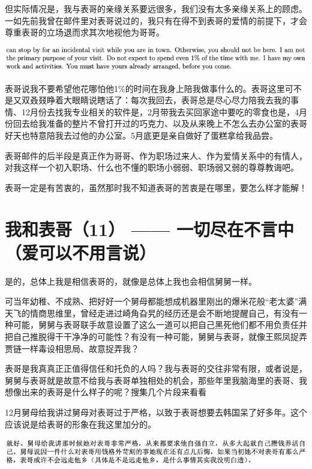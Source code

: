 \documentclass[9pt, b5paper]{article}
\begin{document}
但实际情况是，我与表哥的亲缘关系要远很多，我们没有太多亲缘关系上的顾虑。一如先前我曾在邮件里对表哥说过的，我只有在得不到表哥的爱情的前提下，才会尊重表哥的立场退而求其次地视他为哥哥。 

\begin{center}
\includegraphics[width=.9\linewidth]{./pic/p1p64-1.png}
\end{center}

表哥说我不要希望他花哪怕他1\%的时间在我身上陪我做事什么的。表哥这里可不是又双叒叕睁着大眼睛说瞎话了：每次我回去，表哥总是尽心尽力陪我去我的事情、12月份去找我专业相关的软件是，2月带我去买回家途中要吃的零食也是，4月份回去给我准备的整片不曾打开过的巧克力、以及从来晚上不怎么去办公室的表哥好天也特意陪我去过他的办公室。5月底更是亲自做好了蛋糕拿给我品尝。

表哥邮件的后半段是真正作为哥哥、作为职场过来人、作为爱情关系中的有情人，对我这样一个初入职场、什么也不懂的职场小弱弱、职场弱又弱的尊尊教诲吧。

表哥一定是有苦衷的，虽然那时我不知道表哥的苦衷是在哪里，要怎么样才能解！
\section{我和表哥（11） —— 一切尽在不言中（爱可以不用言说）}
\label{sec:org22784ad}

是的，总体上我是相信表哥的，就像是总体上我也会相信舅舅一样。

可当年幼稚、不成熟、把好好一个舅母都能想成机器里刚出的爆米花般“老太婆”满天飞的情商思维里，曾经走进过崎角旮旯的经历还是会不断地提醒自己，有没有一种可能，舅舅与表哥联手故意设置了这么一道可以把自己黑死他们都不用负责任并把自己推脱得干干净净的可能性？有没有一种可能，舅舅与表哥，就像王熙凤捉弄贾链一样毒设相思局、故意捉弄我？

表哥是我真真正正值得信任和托负的人吗？我与表哥的交往非常有限，或者说是，舅舅与表哥就是故意不给我与表哥单独相处的机会，那些年里我脑海里的表哥、我想像出来的表哥是什么样子的呢？搜集几个片段来看看


12月舅母给我讲过舅母对表哥过于严格，以致于表哥想要去韩国呆了好多年。这个应该说是给表哥的形象在我这里加分的。  

\begin{center}
\includegraphics[width=.9\linewidth]{./pic/p1p42.png}
\end{center}
\end{document}
